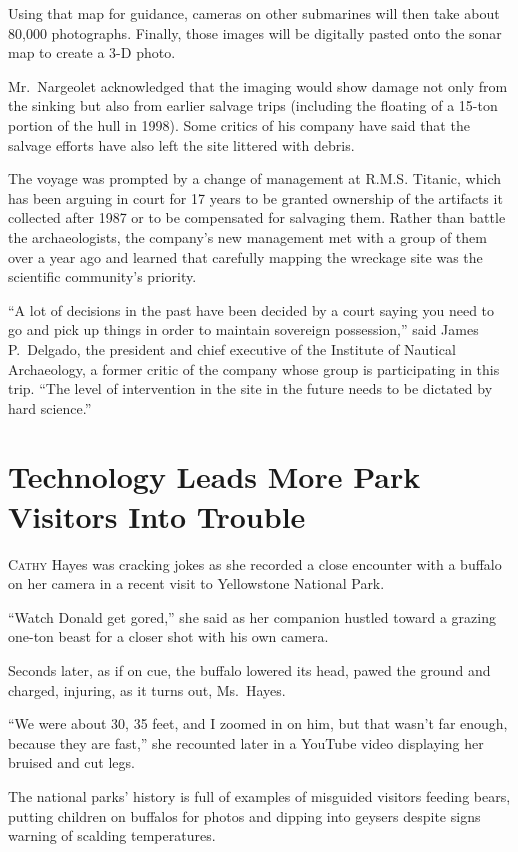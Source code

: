 ﻿\documentclass[12pt]{article}
\begin{document}
Using that map for guidance, cameras on other submarines will then take about 80,000 photographs.
Finally, those images will be digitally pasted onto the sonar map to create a 3-D photo.

Mr.~Nargeolet acknowledged that the imaging would show damage not only from the sinking but also
from earlier salvage trips (including the floating of a 15-ton portion of the hull in 1998). Some
critics of his company have said that the salvage efforts have also left the site littered with
debris.

The voyage was prompted by a change of management at R.M.S. Titanic, which has been arguing in court
for 17 years to be granted ownership of the artifacts it collected after 1987 or to be compensated
for salvaging them. Rather than battle the archaeologists, the company's new management met with a
group of them over a year ago and learned that carefully mapping the wreckage site was the
scientific community's priority.

``A lot of decisions in the past have been decided by a court saying you need to go and pick up
things in order to maintain sovereign possession,'' said James P.~Delgado, the president and chief
executive of the Institute of Nautical Archaeology, a former critic of the company whose group is
participating in this trip. ``The level of intervention in the site in the future needs to be
dictated by hard science.''

\pagebreak
\section{Technology Leads More Park Visitors Into Trouble}

\lettrine{C}{athy} Hayes was cracking jokes as she recorded a close
encounter with a buffalo on her camera in a recent visit to Yellowstone National Park.

``Watch Donald get gored,'' she said as her companion hustled toward a grazing one-ton beast for a
closer shot with his own camera.

Seconds later, as if on cue, the buffalo lowered its head, pawed the ground and charged, injuring,
as it turns out, Ms.~Hayes.

``We were about 30, 35 feet, and I zoomed in on him, but that wasn't far enough, because they are
fast,'' she recounted later in a YouTube video displaying her bruised and cut legs.

The national parks' history is full of examples of misguided visitors feeding bears, putting
children on buffalos for photos and dipping into geysers despite signs warning of scalding
temperatures.
\end{document}
